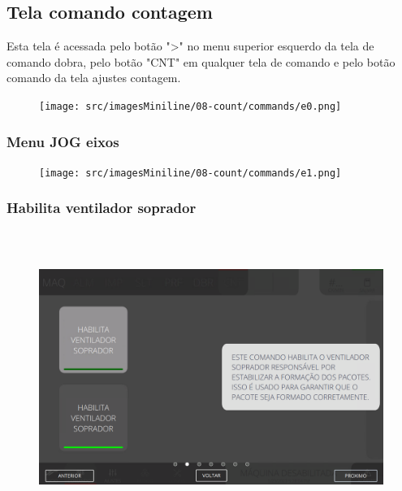 \thispagestyle{fancy}
\vspace*{40 pt}
\subsection{Tela comando contagem}\label{miniTelaComandoContagem}
 Esta tela é acessada pelo botão "\textgreater" no menu superior esquerdo da tela de comando dobra, pelo botão "CNT" em qualquer tela de comando e pelo botão comando da tela ajustes contagem.
 \vspace*{\fill}
 \begin{figure}[h]
  \centering
  \texttt{[image: src/imagesMiniline/08-count/commands/e0.png]}
\end{figure}
\vspace*{\fill}

\newpage
\thispagestyle{fancy}
\vspace*{40 pt}
\subsubsection{\small{Menu JOG eixos}}\label{miniTelaComandoContagemMenuJOGEixos}
\vspace*{\fill}
\begin{figure}[h]
  \centering
  \texttt{[image: src/imagesMiniline/08-count/commands/e1.png]}
\end{figure}
\vspace*{\fill}

\newpage
\thispagestyle{fancy}
\vspace*{40 pt}
\subsubsection{\small{Habilita ventilador soprador}}\label{miniTelaComandoContagemHabilitaVentiladorSoprador}
\vspace*{\fill}
\begin{figure}[h]
  \centering
  \includegraphics[width=576px,height=360px]{src/imagesFlexo/08-count/commands/e-2.png}
\end{figure}
\vspace*{\fill}

